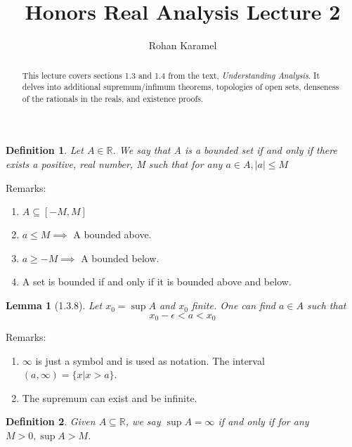 \documentclass[12pt,reqno]{amsart}
\title{Honors Real Analysis Lecture 2}
\author{Rohan Karamel}
\theoremstyle{plain}
\newtheorem*{definition}{Definition}
\newtheorem*{lemma}{Lemma}
\begin{document}
    \begin{abstract}
        This lecture covers sections 1.3 and 1.4 from the text, \textit{Understanding Analysis}.
        It delves into additional supremum/infimum theorems, topologies of open sets, denseness of the rationals in the reals, and existence proofs. 
    \end{abstract}

    \maketitle

    \begin{definition}
        Let $A \in \mathbb{R}$.
        We say that A is a bounded set if and only if there exists a positive, real number, M such that for any $a \in A, |a| \le M$ 
    \end{definition}

    Remarks:
    \begin{enumerate}
        \item $A \subseteq [-M, M]$ 
        \item $a \le M \implies$ A bounded above. 
        \item $a \ge -M \implies$ A bounded below.
        \item A set is bounded if and only if it is bounded above and below. 
    \end{enumerate}

    \begin{lemma}[1.3.8]
        Let $x_0 = \sup{A}$ and $x_0$ finite. One can find $a \in A$ such that 
        \[ x_0 - \epsilon < a < x_0 \]
    \end{lemma}

    Remarks: 
    \begin{enumerate}
        \item $\infty$ is just a symbol and is used as notation. The interval ${(a,\infty)} = \{ x \vert x > a\}$.
        \item The supremum can exist and be infinite.
    \end{enumerate}


    \begin{definition}
        Given $A \subseteq \mathbb{R}$, we say $\sup{A} = \infty$ if and only if for any $M > 0, \sup{A} > M$.
    \end{definition}

    \pagebreak
\end{document}
